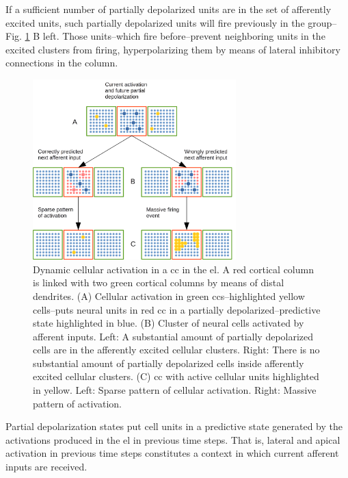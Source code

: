 \documentclass[10pt,letterpaper]{article}
\begin{document}
If a sufficient number of partially depolarized units are in the set of
afferently excited units, such partially depolarized units
will fire previously in the group--Fig. \ref{fig:Activation} B left.
Those units--which fire before--prevent neighboring units in the excited clusters from firing,
hyperpolarizing them by means of lateral inhibitory connections in the column.

\begin{figure}[h!]
    \centering
    \includegraphics[width=0.7\textwidth]{Activation.png}
    \caption{Dynamic cellular activation in a \gls{cc} in the \gls{el}.
    A red cortical column is linked with two green cortical columns by means of distal dendrites.
    (A) Cellular activation in green \glspl{cc}--highlighted yellow cells--puts neural units
    in red \gls{cc} in a partially depolarized--predictive state highlighted in blue.
    (B) Cluster of neural cells activated by afferent inputs.
    Left: A substantial amount of partially depolarized cells are in the afferently excited cellular clusters.
    Right: There is no substantial amount of partially depolarized cells inside afferently excited cellular clusters.
    (C) \gls{cc} with active cellular units highlighted in yellow.
    Left: Sparse pattern of cellular activation.
    Right: Massive pattern of activation.}
    \label{fig:Activation}
\end{figure}

\pagebreak

Partial depolarization states put cell units in a predictive state generated by
the activations produced in the \gls{el} in previous time steps.
That is, lateral and apical activation in previous time steps constitutes a context in which
current afferent inputs are received.
\end{document}
